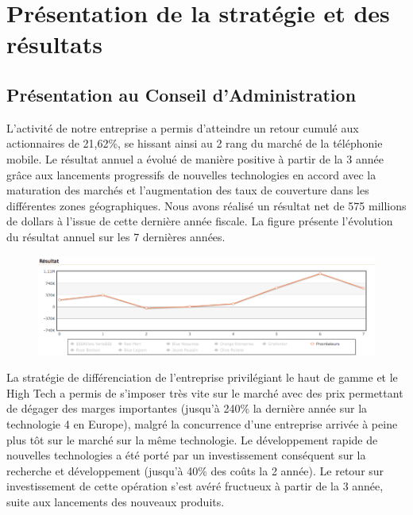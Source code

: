 \documentclass[a4paper,11pt]{article}
\theoremstyle{remark}
\begin{document}
\begin{titlepage}
\end{titlepage}



\section{Présentation de la stratégie et des résultats}

	\subsection{Présentation au Conseil d’Administration}
	
		L’activité de notre entreprise a permis d’atteindre un retour cumulé aux actionnaires de 21,62\%, se hissant ainsi au 2 rang du marché de la  téléphonie mobile.
		Le résultat annuel a évolué de manière positive à partir de la 3 année grâce aux lancements progressifs de nouvelles technologies en accord avec la maturation des marchés et  l’augmentation des taux de couverture dans les différentes zones géographiques.
		Nous avons réalisé un résultat net de 575 millions de dollars à l’issue de cette dernière année fiscale.
		La figure présente l’évolution du résultat annuel sur les 7 dernières années.
		
		\begin{figure}[htp]
		\centering
		\includegraphics[scale=0.5]{./courbe_resultats.png}
		\end{figure}
		
		La stratégie de différenciation de l’entreprise privilégiant le haut de gamme et le High Tech a permis de s’imposer très vite sur le marché avec des prix permettant de dégager des marges importantes (jusqu’à 240\% la dernière année sur la technologie 4 en Europe), malgré la concurrence d’une entreprise arrivée à peine plus tôt sur le marché sur la même technologie.
		Le développement rapide de nouvelles technologies a été porté par un investissement conséquent sur la recherche et développement (jusqu’à 40\% des coûts la 2 année).
		Le retour sur investissement de cette opération s’est avéré fructueux à partir de la 3 année, suite aux lancements des nouveaux produits.  
\end{document}
